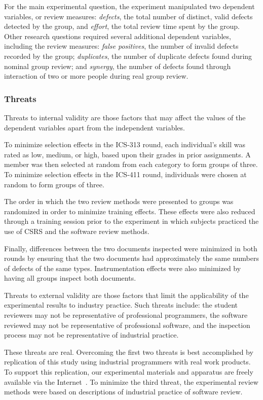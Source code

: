 For the main experimental question, the experiment manipulated two
dependent variables, or review measures: {\em defects}, the total number of
distinct, valid defects detected by the group, and {\em effort}, the total
review time spent by the group.  Other research questions 
required several additional dependent variables, including the review
measures: {\em false positives}, the number of invalid defects recorded by
the group; {\em duplicates}, the number of duplicate defects found during
nominal group review; and {\em synergy}, the number of defects found
through interaction of two or more people during real group review.

\subsubsection{Threats}

Threats to internal validity are those factors that may affect the values
of the dependent variables apart from the independent variables.

To minimize selection effects in the ICS-313 round, each
individual's skill was rated as low, medium, or high, based upon their grades in
prior assignments. A member was then selected at random from each category
to form groups of three. To minimize selection effects in the ICS-411
round, individuals were chosen at random to form groups of three.

The order in which the two review methods were presented to groups was
randomized in order to minimize training effects. These effects were also
reduced through a training session prior to the experiment in which
subjects practiced the use of CSRS and the software review methods.

Finally, differences between the two documents inspected
were minimized in both rounds by ensuring that the two documents had approximately the
same numbers of defects of the same types. 
Instrumentation effects were also minimized by having all groups inspect both documents.

Threats to external validity are those factors that limit the applicability
of the experimental results to industry practice. Such threats include: the
student reviewers may not be representative of professional programmers,
the software reviewed may not be representative of professional software,
and the inspection process may not be representative of industrial
practice.

These threats are real.  Overcoming the first two threats is best
accomplished by replication of this study using industrial programmers with
real work products. To support this replication, our experimental materials
and apparatus are freely available via the 
Internet~\cite{csdl-www-csrs}.   To minimize the
third threat, the experimental review methods were based on descriptions of 
industrial practice of software review. 


